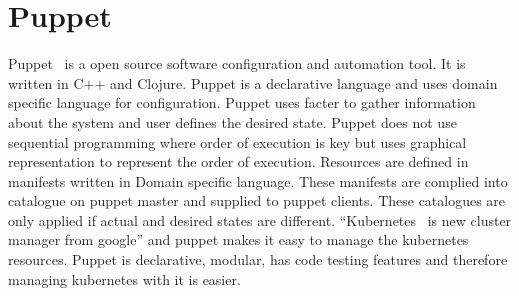 \section{Puppet}

Puppet~\cite{hid-sp18-413-puppet} is a open source software configuration and
automation tool. It is written in C++ and Clojure. Puppet is a declarative
language and uses domain specific language for configuration. Puppet uses facter
to gather information about the system and user defines the desired
state. Puppet does not use sequential programming where order of execution is
key but uses graphical representation to represent the order of
execution. Resources are defined in manifests written in Domain specific
language. These manifests are complied into catalogue on puppet master and
supplied to puppet clients. These catalogues are only applied if actual and
desired states are different. ``Kubernetes~\cite{hid-sp18-413-Kubernetes} is
new cluster manager from google'' and puppet makes it easy to manage the
kubernetes resources. Puppet is declarative, modular, has code testing features
and therefore managing kubernetes with it is easier.
